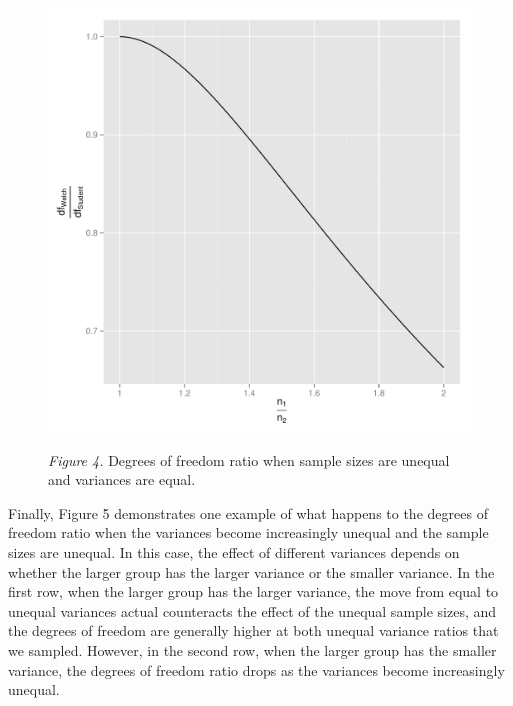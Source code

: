 \documentclass[man,a4paper,noextraspace,apacite]{apa6}\usepackage[]{graphicx}\usepackage[]{color}
\makeatletter
\def\maxwidth{ %
  \ifdim\Gin@nat@width>\linewidth
    \linewidth
  \else
    \Gin@nat@width
  \fi
}
\newenvironment{knitrout}{}{} %
\makeatother
\begin{document}
\begin{figure}
\begin{knitrout}
\color{fgcolor}
\includegraphics[width=\maxwidth]{figure/dfratiosDiffNratios} 

\end{knitrout}
\textit{Figure 4.} Degrees of freedom ratio when sample sizes are unequal and variances are equal.
\end{figure}

    Finally, Figure 5 demonstrates one example of what happens to the degrees of freedom ratio when the variances become increasingly unequal and the sample sizes are unequal. In this case, the effect of different variances depends on whether the larger group has the larger variance or the smaller variance. In the first row, when the larger group has the larger variance, the move from equal to unequal variances actual counteracts the effect of the unequal sample sizes, and the degrees of freedom are generally higher at both unequal variance ratios that we sampled. However, in the second row, when the larger group has the smaller variance, the degrees of freedom ratio drops as the variances become increasingly unequal. 
\end{document}
